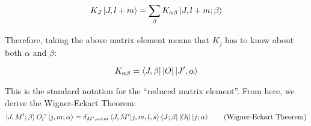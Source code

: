 \documentclass[a4paper,twoside,master.tex]{subfiles}
\begin{document}
\begin{equation}
    K_J\ket{J,l+m} = \sum_{\beta} K_{\alpha \beta}\ket{J, l+m; \beta}
\end{equation}

Therefore, taking the above matrix element means that $ K_j $ has to know about both $ \alpha $ and $ \beta $:

\begin{equation}
    K_{\alpha \beta} =\bra{J, \beta} | O|\ket{J', \alpha}
\end{equation}

This is the standard notation for the ``reduced matrix element''. From here, we derive the Wigner-Eckart Theorem:
\begin{equation}\label{eq:wigner_eckart_theorem}
    \ket{J,M';\beta} O\indices{_l^s}\ket{j,m; \alpha} = \delta_{M', s+m}\bra{J,M'}\ket{j,m,l,s}\bra{J; \beta} |O_l|\ket{j; \alpha}\tag{Wigner-Eckart Theorem}
\end{equation}
\end{document}

